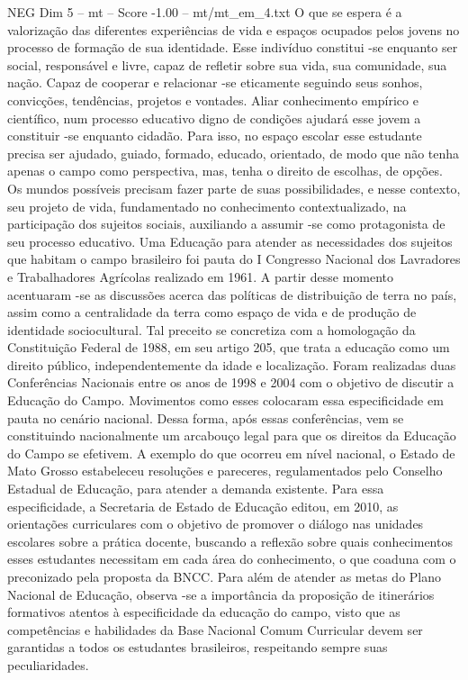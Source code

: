 \begin{textsample}{NEG Dim 5 – mt – Score -1.00 – mt/mt\_em\_4.txt}
O que se espera é a valorização das diferentes experiências de vida e espaços ocupados pelos jovens no processo de formação de sua identidade.
Esse indivíduo constitui -se enquanto ser social, responsável e livre, capaz de refletir sobre sua vida, sua comunidade, sua nação.
Capaz de cooperar e relacionar -se eticamente seguindo seus sonhos, convicções, tendências, projetos e vontades.
Aliar conhecimento empírico e científico, num processo educativo digno de condições ajudará esse jovem a constituir -se enquanto cidadão.
Para isso, no espaço escolar esse estudante precisa ser ajudado, guiado, formado, educado, orientado, de modo que não tenha apenas o campo como perspectiva, mas, tenha o direito de escolhas, de opções.
Os mundos possíveis precisam fazer parte de suas possibilidades, e nesse contexto, seu projeto de vida, fundamentado no conhecimento contextualizado, na participação dos sujeitos sociais, auxiliando a assumir -se como protagonista de seu processo educativo.
Uma Educação para atender as necessidades dos sujeitos que habitam o campo brasileiro foi pauta do I Congresso Nacional dos Lavradores e Trabalhadores Agrícolas realizado em 1961.
A partir desse momento acentuaram -se as discussões acerca das políticas de distribuição de terra no país, assim como a centralidade da terra como espaço de vida e de produção de identidade sociocultural.
Tal preceito se concretiza com a homologação da Constituição Federal de 1988, em seu artigo 205, que trata a educação como um direito público, independentemente da idade e localização.
Foram realizadas duas Conferências Nacionais entre os anos de 1998 e 2004 com o objetivo de discutir a Educação do Campo.
Movimentos como esses colocaram essa especificidade em pauta no cenário nacional.
Dessa forma, após essas conferências, vem se constituindo nacionalmente um arcabouço legal para que os direitos da Educação do Campo se efetivem.
A exemplo do que ocorreu em nível nacional, o Estado de Mato Grosso estabeleceu resoluções e pareceres, regulamentados pelo Conselho Estadual de Educação, para atender a demanda existente.
Para essa especificidade, a Secretaria de Estado de Educação editou, em 2010, as orientações curriculares com o objetivo de promover o diálogo nas unidades escolares sobre a prática docente, buscando a reflexão sobre quais conhecimentos esses estudantes necessitam em cada área do conhecimento, o que coaduna com o preconizado pela proposta da BNCC.
Para além de atender as metas do Plano Nacional de Educação, observa -se a importância da proposição de itinerários formativos atentos à especificidade da educação do campo, visto que as competências e habilidades da Base Nacional Comum Curricular devem ser garantidas a todos os estudantes brasileiros, respeitando sempre suas peculiaridades.

\end{textsample}
